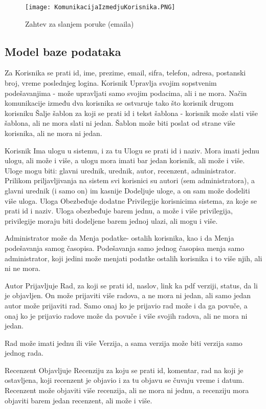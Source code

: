 \documentclass[a4paper]{article}
\begin{document}
\begin{figure}[hbt!]
    \centering
    \texttt{[image: KomunikacijaIzmedjuKorisnika.PNG]}
    \caption{Zahtev za slanjem poruke (emaila)}
    \label{fig:my_label}
\end{figure}

\subsection{Model baze podataka}

Za Korisnika se prati id, ime, prezime, email, sifra, telefon, adresa, postanski broj, vreme poslednjeg logina. Korisnik Upravlja svojim sopstvenim podešavanjima - može upravljati samo svojim podacima, ali i ne mora. Način komunikacije između dva korisnika se ostvaruje tako što korisnik drugom korisniku Šalje šablon za koji se prati id i tekst šablona - korisnik može slati više šablona, ali ne mora slati ni jedan. Šablon može biti poslat od strane više korisnika, ali ne mora ni jedan.

Korisnik Ima ulogu u sistemu, i za tu Ulogu se prati id i naziv. Mora imati jednu ulogu, ali može i više, a ulogu mora imati bar jedan korisnik, ali može i više. Uloge mogu biti: glavni urednik, urednik, autor, recenzent, administrator. Prilikom priljavljivanja na sistem svi korisnici su autori (sem administratora), a glavni urednik (i samo on) im kasnije Dodeljuje uloge, a on sam može dodeliti više uloga. Uloga Obezbeđuje dodatne Privilegije korisnicima sistema, za koje se prati id i naziv. Uloga obezbeđuje barem jednu, a može i više privilegija, privilegije moraju biti dodeljene barem jednoj ulazi, ali mogu i više.

Administrator može da Menja podatke- ostalih korisnika, kao i da Menja podešavanja samog časopisa. Podešavanja samo jednog časopisa menja samo administrator, koji jedini može menjati podatke ostalih korisnika i to više njih, ali ni ne mora.

Autor Prijavljuje Rad, za koji se prati id, naslov, link ka pdf verziji, status, da li je objavljen. On može prijaviti više radova, a ne mora ni jedan, ali samo jedan autor može prijaviti rad. Samo onaj ko je prijavio rad može i da ga povuče, a onaj ko je prijavio radove može da povuče i više svojih radova, ali ne mora ni jedan.

Rad može imati jednu ili više Verzija, a sama verzija može biti verzija samo jednog rada.

Recenzent Objavljuje Recenziju za koju se prati id, komentar, rad na koji je ostavljena, koji recenzent je objavio i za tu objavu se čuvaju vreme i datum. Recenzent može objaviti više recenzija, ali ne mora ni jednu, a recenziju mora objaviti barem jedan recenzent, ali može i više.
\end{document}
